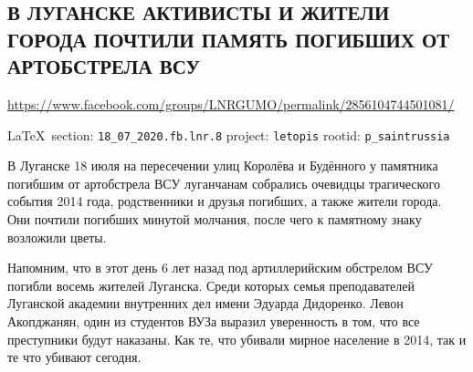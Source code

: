  
 
\subsection{В ЛУГАНСКЕ АКТИВИСТЫ И ЖИТЕЛИ ГОРОДА ПОЧТИЛИ ПАМЯТЬ ПОГИБШИХ ОТ АРТОБСТРЕЛА ВСУ}
\label{sec:18_07_2020.fb.lnr.8}
\url{https://www.facebook.com/groups/LNRGUMO/permalink/2856104744501081/}
  
\vspace{0.5cm}
{\small\LaTeX~section: \verb|18_07_2020.fb.lnr.8| project: \verb|letopis| rootid: \verb|p_saintrussia|}
\vspace{0.5cm}

В Луганске 18 июля на пересечении улиц Королёва и Будённого у памятника
погибшим от артобстрела ВСУ луганчанам собрались очевидцы трагического события
2014 года, родственники и друзья погибших, а также жители города. Они почтили
погибших минутой молчания, после чего к памятному знаку возложили цветы.

Напомним, что в этот день 6 лет назад под артиллерийским обстрелом ВСУ погибли
восемь жителей Луганска. Среди которых семья преподавателей Луганской академии
внутренних дел имени Эдуарда Дидоренко. Левон Акопджанян, один из студентов
ВУЗа выразил уверенность в том, что все преступники будут наказаны. Как те, что
убивали мирное население в 2014, так и те что убивают сегодня.
  
